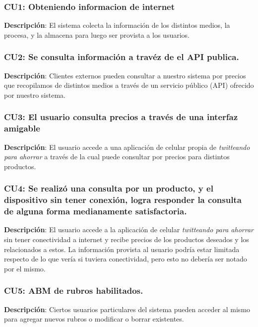 \subsubsection{CU1: Obteniendo informacion de internet}

\textbf{Descripción}: El sistema colecta la información de los distintos
medios, la procesa, y la almacena para luego ser provista a los
usuarios.

\subsubsection{CU2: Se consulta información a travéz de el API publica.}

\textbf{Descripción}: Clientes externos pueden consultar a nuestro
sistema por precios que recopilamos de distintos medios a través de un
servicio público (API) ofrecido por nuestro sistema.

\subsubsection{CU3: El usuario consulta precios a través de una interfaz
amigable}

\textbf{Descripción}: El usuario accede a una aplicación de celular
propia de \emph{twitteando para ahorrar} a través de la cual puede
consultar por precios para distintos productos.

\subsubsection{CU4: Se realizó una consulta por un producto, y el
dispositivo sin tener conexión, logra responder la consulta de alguna
forma medianamente satisfactoria.}

\textbf{Descripción}: El usuario accede a la aplicación de celular
\emph{twitteando para ahorrar} sin tener conectividad a internet y
recibe precios de los productos deseados y los relacionados a estos. La
información provista al usuario podría estar limitada respecto de lo que
vería si tuviera conectividad, pero esto no debería ser notado por el
mismo.

\subsubsection{CU5: ABM de rubros habilitados.}

\textbf{Descripción}: Ciertos usuarios particulares del sistema pueden
acceder al mismo para agregar nuevos rubros o modificar o borrar
existentes.

